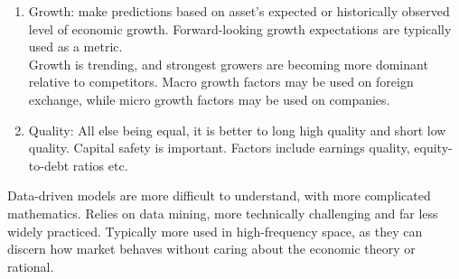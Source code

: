 \begin{definition}
\begin{enumerate}[label=\roman*.]
\item Growth: make predictions based on asset's expected or historically observed level of economic growth. Forward-looking growth expectations are typically used as a metric.\\
Growth is trending, and strongest growers are becoming more dominant relative to competitors. Macro growth factors may be used on foreign exchange, while micro growth factors may be used on companies.
\item Quality: All else being equal, it is better to long high quality and short low quality. Capital safety is important. Factors include earnings quality, equity-to-debt ratios etc.
\end{enumerate}
\end{definition}

Data-driven models are more difficult to understand, with more complicated mathematics. Relies on data mining, more technically challenging and far less widely practiced. Typically more used in high-frequency space, as they can discern how market behaves without caring about the economic theory or rational.

